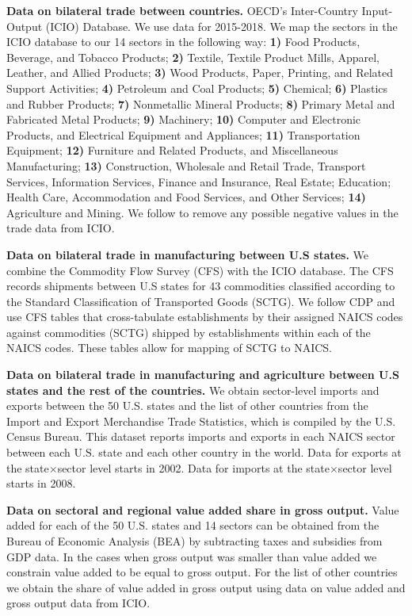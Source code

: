 \documentclass[12pt]{article}
\begin{document}
\textbf{Data on bilateral trade between countries.} OECD’s Inter-Country Input-Output (ICIO) Database. We use data for 2015-2018. We map the sectors in the ICIO database to our 14 sectors in the following way: \textbf{1)} Food Products, Beverage, and Tobacco Products; \textbf{2)} Textile, Textile Product Mills, Apparel, Leather, and Allied Products; \textbf{3)} Wood Products, Paper, Printing, and Related Support Activities; \textbf{4)} Petroleum and Coal Products; \textbf{5)} Chemical; \textbf{6)} Plastics and Rubber Products; \textbf{7)} Nonmetallic Mineral Products; \textbf{8)} Primary Metal and Fabricated Metal Products; \textbf{9)} Machinery; \textbf{10)} Computer and Electronic Products, and Electrical Equipment and Appliances; \textbf{11)} Transportation Equipment; \textbf{12)} Furniture and Related Products, and Miscellaneous Manufacturing; \textbf{13)} Construction, Wholesale and Retail Trade, Transport Services, Information Services, Finance and Insurance, Real Estate; Education; Health Care, Accommodation and Food Services, and Other Services; \textbf{14)} Agriculture and Mining. We follow \cite{Costinot2014} to remove any possible negative values in the trade data from ICIO.

\textbf{Data on bilateral trade in manufacturing between U.S states.} We combine the Commodity Flow Survey (CFS) with the ICIO database. The CFS records shipments between U.S states for 43 commodities classified according to the Standard Classification of Transported Goods (SCTG). We follow CDP and use CFS tables that cross-tabulate establishments by their assigned NAICS codes against commodities (SCTG) shipped by establishments within each of the NAICS codes. These tables allow for mapping of SCTG to NAICS.

\textbf{Data on bilateral trade in manufacturing and agriculture between U.S states and the rest of the countries.} We obtain sector-level imports and exports  between the 50 U.S. states and the list of other countries from the Import and Export Merchandise Trade Statistics, which is compiled by the U.S. Census Bureau. This dataset  reports imports and exports in each NAICS sector between each U.S. state and each other country in the world. Data for exports at the  state$\times$sector level starts in 2002. Data for imports at the state$\times$sector level starts in 2008.

\textbf{Data on sectoral and regional value added share in gross output.} Value added for each of the 50 U.S. states and 14 sectors can be obtained from the Bureau of Economic Analysis (BEA) by subtracting taxes and subsidies from GDP data. In the cases when gross output was smaller than value added we constrain value added to be equal to gross output. For the list of other countries we obtain the share of value added in gross output using data on value added and gross output data from ICIO.
\end{document}
